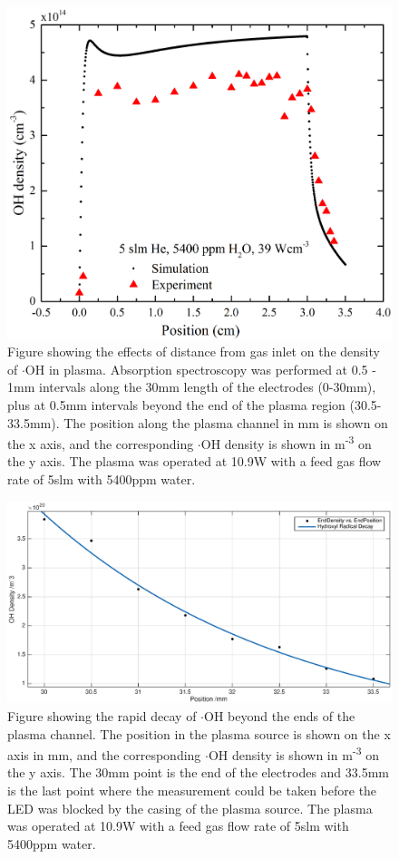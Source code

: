 \documentclass[11pt, oneside]{article}   	%
\begin{document}
\begin{figure}
    \centering
    \includegraphics[width=\textwidth]{Figures/OHSpatialwithSim.jpg}
    \caption{Figure showing the effects of distance from gas inlet on the density of $\cdot$OH in plasma. Absorption spectroscopy was performed at 0.5 - 1mm intervals along the 30mm length of the electrodes (0-30mm), plus at 0.5mm intervals beyond the end of the plasma region (30.5-33.5mm). The position along the plasma channel in mm is shown on the x axis, and the corresponding $\cdot$OH density is shown in m\textsuperscript{-3} on the y axis. The plasma was operated at 10.9W with a feed gas flow rate of 5slm with 5400ppm water.}
    \label{fig:SpatialRes}
\end{figure}

\begin{figure}
	\centering
	\includegraphics[width=\textwidth]{Figures/OHdecay.eps}
	\caption{Figure showing the rapid decay of $\cdot$OH beyond the ends of the plasma channel. The position in the plasma source is shown on the x axis in mm, and the corresponding $\cdot$OH density is shown in m\textsuperscript{-3} on the y axis. The 30mm point is the end of the electrodes and 33.5mm is the last point where the measurement could be taken before the LED was blocked by the casing of the plasma source. The plasma was operated at 10.9W with a feed gas flow rate of 5slm with 5400ppm water.}
	\label{fig:OH decay}
\end{figure}
\end{document}
